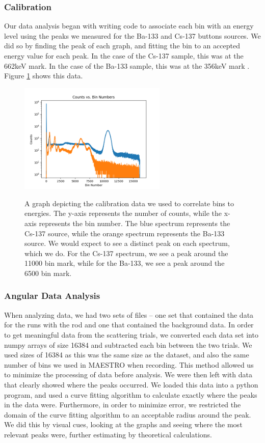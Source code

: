 \documentclass[10pt,letterpaper,onecolumn]{article}
\begin{document}
\subsubsection*{Calibration}
Our data analysis began with writing code to associate each bin with an energy level using the peaks we measured for the Ba-133 and Cs-137 buttons sources. We did so by finding the peak of each graph, and fitting the bin to an accepted energy value for each peak. In the case of the Cs-137 sample, this was at the 662keV mark\cite{GammaSpectacularCS137}. In the case of the Ba-133 sample, this was at the 356keV mark \cite{GammaSpectacularBA133}. Figure \ref{fig:calibration} shows this data. 
\begin{figure}[hbt!]
    \begin{center}
        {{\includegraphics[width=7cm]{calib.png} }}%
        \caption{A graph depicting the calibration data we used to correlate bins to energies. The y-axis represents the number of counts, while the x-axis represents the bin number. The blue spectrum represents the Cs-137 source, while the orange spectrum represents the Ba-133 source. We would expect to see a distinct peak on each spectrum, which we do. For the Cs-137 spectrum, we see a peak around the 11000 bin mark, while for the Ba-133, we see a peak around the 6500 bin mark.}%
        \label{fig:calibration}%
    \end{center}
\end{figure}
\subsubsection*{Angular Data Analysis}
When analyzing data, we had two sets of files -- one set that contained the data for the runs with the rod and one that contained the background data. In order to get meaningful data from the scattering trials, we converted each data set into numpy arrays of size 16384 and subtracted each bin between the two trials. We used sizes of 16384 as this was the same size as the dataset, and also the same number of bins we used in MAESTRO when recording. This method allowed us to minimize the processing of data before analysis. We were then left with data that clearly showed where the peaks occurred. We loaded this data into a python program, and used a curve fitting algorithm to calculate exactly where the peaks in the data were. Furthermore, in order to minimize error, we restricted the domain of the curve fitting algorithm to an acceptable radius around the peak. We did this by visual cues, looking at the graphs and seeing where the most relevant peaks were, further estimating by theoretical calculations.
\end{document}
